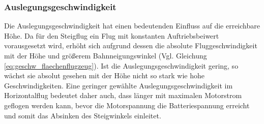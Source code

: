 
\subsubsection{Auslegungsgeschwindigkeit}
Die Auslegungsgeschwindigkeit hat einen bedeutenden Einfluss auf die erreichbare Höhe. Da für den Steigflug ein Flug mit konstanten Auftriebsbeiwert vorausgesetzt wird, erhöht sich aufgrund dessen die absolute Fluggeschwindigkeit mit der Höhe und größerem Bahnneigungswinkel (Vgl. Gleichung \ref{eq:geschw_flaechenflugzeug}). Ist die Auslegungsgeschwindigkeit gering, so wächst sie absolut gesehen mit der Höhe nicht so stark wie hohe Geschwindigkeiten. Eine geringer gewählte Auslegungsgeschwindigkeit im Horizontalflug bedeutet daher auch, dass länger mit maximalen Motorstrom geflogen werden kann, bevor die Motorspannung die Batteriespannung erreicht und somit das Absinken des Steigwinkels einleitet.



